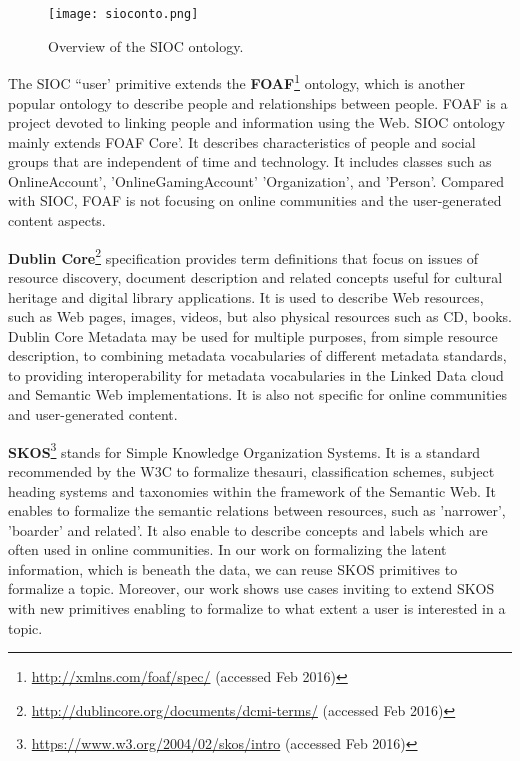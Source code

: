 \begin{figure}%
\centering
\texttt{[image: sioconto.png]}  
\caption{Overview of the SIOC ontology.}
\label{fig:siocontos} 
\end{figure}

The SIOC ``user' primitive extends the \textbf{FOAF}\footnote{\url{http://xmlns.com/foaf/spec/} (accessed Feb 2016)} ontology, which is another popular ontology to describe people and relationships between people. FOAF is a project devoted to linking people and information using the Web. SIOC ontology mainly extends FOAF Core'. It describes characteristics of people and social groups that are independent of time and technology. It includes classes such as OnlineAccount', 'OnlineGamingAccount' 'Organization', and 'Person'. Compared with SIOC, FOAF is not focusing on online communities and the user-generated content aspects. 
 
\textbf{Dublin Core}\footnote{\url{http://dublincore.org/documents/dcmi-terms/} (accessed Feb 2016)} specification provides term definitions that focus on issues of resource discovery, document description and related concepts useful for cultural heritage and digital library applications. It is used to describe Web resources, such as Web pages, images, videos, but also physical resources such as CD, books. Dublin Core Metadata may be used for multiple purposes, from simple resource description, to combining metadata vocabularies of different metadata standards, to providing interoperability for metadata vocabularies in the Linked Data cloud and Semantic Web implementations. It is also not specific for online communities and user-generated content.

\textbf{SKOS}\footnote{\url{https://www.w3.org/2004/02/skos/intro} (accessed Feb 2016)} stands for Simple Knowledge Organization Systems. It is a standard recommended by the W3C to formalize thesauri, classification schemes, subject heading systems and taxonomies within the framework of the Semantic Web. It enables to formalize the semantic relations between resources, such as 'narrower', 'boarder' and related'. It also enable to describe concepts and labels which are often used in online communities. 
In our work on formalizing the latent information, which is beneath the data, we can reuse SKOS primitives to formalize a topic. Moreover, our work shows use cases inviting to extend SKOS with new primitives enabling to formalize to what extent a user is interested in a topic.

 
